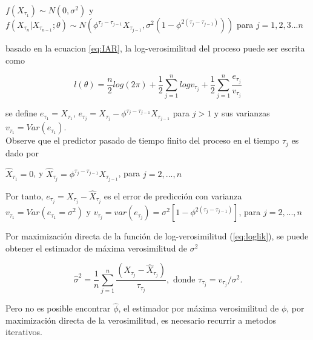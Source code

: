 $f(X_{\tau_1}) \sim N(0, \sigma^2)$ y $f(X_{\tau_n}|X_{\tau_{n-1}};\theta) \sim N(\phi^{\tau_j-\tau_{j-1}}X_{\tau_{j-1}}, \sigma^2(1-\phi^{2(\tau_j-\tau_{j-1})}))$ 
para $j = 1,2,3 ... n$

basado en la ecuacion \ref{eq:IAR}, la log-verosimilitud del proceso puede ser escrita como

\begin{equation}
	l(\theta) = \frac{n}{2}log(2\pi) + \frac{1}{2}\sum_{j=1}^{n} log v_{\tau_j} +  \frac{1}{2}\sum_{j=1}^{n}\frac{e_{\tau_j}}{v_{\tau_j}}
	\label{eq:loglik}
\end{equation}

se define $e_{\tau_1} = X_{\tau_1}$, $e_{\tau_j} = X_{\tau_j}-\phi^{\tau_j-\tau_{j-1}}X_{\tau_{j-1}}$ para $j>1$ y sus varianzas $v_{\tau_1} = Var(e_{\tau_1}) $.\\

Observe que el predictor pasado de tiempo finito del proceso en el tiempo $\tau_j$ es dado por 

$\hat{X}_{\tau_1} = 0$, y $\hat{X}_{\tau_j} = \phi^{\tau_j - \tau_{j-1}} X_{\tau_{j-1}}$, para $j = 2, ... , n$ 

Por tanto, $e_{\tau_j} = X_{\tau_j} - \hat{X}_{\tau_j}$ es el error de predicción con varianza $v_{\tau_1} = Var(e_{\tau_1} = \sigma^2)$ y
$v_{\tau_j} = var(e_{\tau_j}) = \sigma^2[1 - \phi^{2(\tau_j - \tau_{j-1})}]$, para $j = 2, ... , n$ 

Por maximización directa de la función de log-verosimilitud (\ref{eq:loglik}), se puede obtener el estimador de máxima verosimilitud de $\sigma^2$

\begin{equation}
	\hat{\sigma}^2 = \frac{1}{n} \sum_{j=1}^{n} \frac{\left(X_{\tau_j} - \hat{X}_{\tau_j}\right)}{\tau_{\tau_j}}, \text{ donde } \tau_{\tau_j} = v_{\tau_j}/\sigma^2.
\end{equation}

Pero no es posible encontrar $\hat{\phi}$, el estimador por máxima verosimilitud de $\phi$, por maximización directa de la verosimilitud, es necesario
recurrir a metodos iterativos. 



